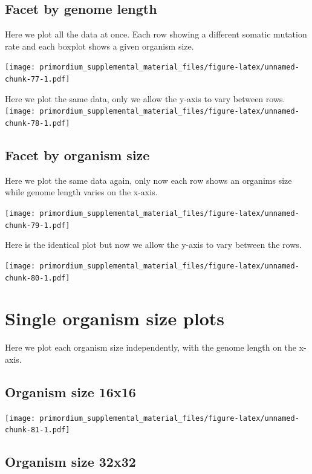 \documentclass[]{book}
\begin{document}
\hypertarget{facet-by-genome-length}{%
\subsection{Facet by genome length}\label{facet-by-genome-length}}

Here we plot all the data at once.
Each row showing a different somatic mutation rate and each boxplot shows a given organism size.

\texttt{[image: primordium\_supplemental\_material\_files/figure-latex/unnamed-chunk-77-1.pdf]}

Here we plot the same data, only we allow the y-axis to vary between rows.
\texttt{[image: primordium\_supplemental\_material\_files/figure-latex/unnamed-chunk-78-1.pdf]}

\hypertarget{facet-by-organism-size-2}{%
\subsection{Facet by organism size}\label{facet-by-organism-size-2}}

Here we plot the same data again, only now each row shows an organims size while genome length varies on the x-axis.

\texttt{[image: primordium\_supplemental\_material\_files/figure-latex/unnamed-chunk-79-1.pdf]}

Here is the identical plot but now we allow the y-axis to vary between the rows.

\texttt{[image: primordium\_supplemental\_material\_files/figure-latex/unnamed-chunk-80-1.pdf]}

\hypertarget{single-organism-size-plots-3}{%
\section{Single organism size plots}\label{single-organism-size-plots-3}}

Here we plot each organism size independently, with the genome length on the x-axis.

\hypertarget{organism-size-16x16-2}{%
\subsection{Organism size 16x16}\label{organism-size-16x16-2}}

\texttt{[image: primordium\_supplemental\_material\_files/figure-latex/unnamed-chunk-81-1.pdf]}

\hypertarget{organism-size-32x32-2}{%
\subsection{Organism size 32x32}\label{organism-size-32x32-2}}
\end{document}
